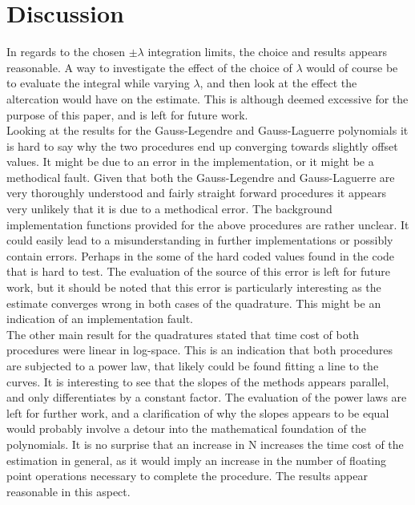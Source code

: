 \documentclass[%
reprint,nofootinbib,
amsmath,amssymb,
aps,
]{revtex4-1}
\begin{document}
\section{Discussion} \noindent 
In regards to the chosen $\pm \lambda$ integration limits, the choice and results appears reasonable. A way to investigate the effect of the choice of $\lambda$ would of course be to evaluate the integral while varying $\lambda$, and then look at the effect the altercation would have on the estimate. This is although deemed excessive for the purpose of this paper, and is left for future work. \\ \indent 
Looking at the results for the Gauss-Legendre and Gauss-Laguerre polynomials it is hard to say why the two procedures end up converging towards slightly offset values. It might be due to an error in the implementation, or it might be a methodical fault.  Given that both the Gauss-Legendre and Gauss-Laguerre are very thoroughly understood and fairly straight forward procedures it appears very unlikely that it is due to a methodical error. The background implementation functions provided for the above procedures are rather unclear. It could easily lead to a misunderstanding in further implementations or possibly contain errors. Perhaps in the some of the hard coded values found in the code that is hard to test. The evaluation of the source of this error is left for future work, but it should be noted that this error is particularly interesting as the estimate converges wrong in both cases of the quadrature. This might be an indication of an implementation fault. \\ \indent
The other main result for the quadratures stated that time cost of both procedures were linear in log-space. This is an indication that both procedures are subjected to a power law, that likely could be found fitting a line to the curves. It is interesting to see that the slopes of the methods appears parallel, and only differentiates by a constant factor. The evaluation of the power laws are left for further work, and a clarification of why the slopes appears to be equal would probably involve a detour into the mathematical foundation of the polynomials. It is no surprise that an increase in N increases the time cost of the estimation in general, as it would imply an increase in the number of floating point operations necessary to complete the procedure. The results appear reasonable in this aspect. \\ \indent 
\end{document}
